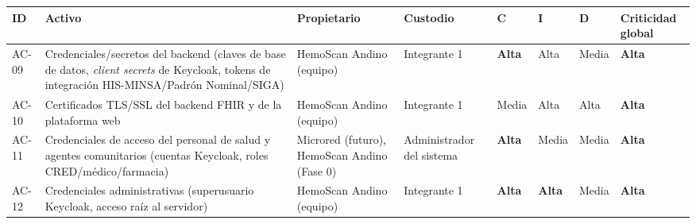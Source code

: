 \documentclass[11pt,a4paper]{article}
\begin{document}
{\small
\begin{longtable}[]{@{}
  >{\raggedright\arraybackslash}p{}
  >{\raggedright\arraybackslash}p{}
  >{\raggedright\arraybackslash}p{}
  >{\raggedright\arraybackslash}p{}
  >{\raggedright\arraybackslash}p{}
  >{\raggedright\arraybackslash}p{}
  >{\raggedright\arraybackslash}p{}
  >{\raggedright\arraybackslash}p{}@{}}
\toprule\noalign{}
\begin{minipage}[b]{\linewidth}\raggedright
ID
\end{minipage} & \begin{minipage}[b]{\linewidth}\raggedright
Activo
\end{minipage} & \begin{minipage}[b]{\linewidth}\raggedright
Propietario
\end{minipage} & \begin{minipage}[b]{\linewidth}\raggedright
Custodio
\end{minipage} & \begin{minipage}[b]{\linewidth}\raggedright
C
\end{minipage} & \begin{minipage}[b]{\linewidth}\raggedright
I
\end{minipage} & \begin{minipage}[b]{\linewidth}\raggedright
D
\end{minipage} & \begin{minipage}[b]{\linewidth}\raggedright
Criticidad global
\end{minipage} \\
\midrule\noalign{}
\endhead
\bottomrule\noalign{}
\endlastfoot
AC-09 & Credenciales/secretos del backend (claves de base de datos, \emph{client secrets} de Keycloak, tokens de integración HIS-MINSA/Padrón Nominal/SIGA) & HemoScan Andino (equipo) & Integrante 1 & \textbf{Alta} & Alta & Media & \textbf{Alta} \\
AC-10 & Certificados TLS/SSL del backend FHIR y de la plataforma web & HemoScan Andino (equipo) & Integrante 1 & Media & Alta & Alta & \textbf{Alta} \\
AC-11 & Credenciales de acceso del personal de salud y agentes comunitarios (cuentas Keycloak, roles CRED/médico/farmacia) & Microred (futuro), HemoScan Andino (Fase 0) & Administrador del sistema & \textbf{Alta} & Media & Media & \textbf{Alta} \\
AC-12 & Credenciales administrativas (superusuario Keycloak, acceso raíz al servidor) & HemoScan Andino (equipo) & Integrante 1 & \textbf{Alta} & \textbf{Alta} & Media & \textbf{Alta} \\
\end{longtable}
}
\end{document}
